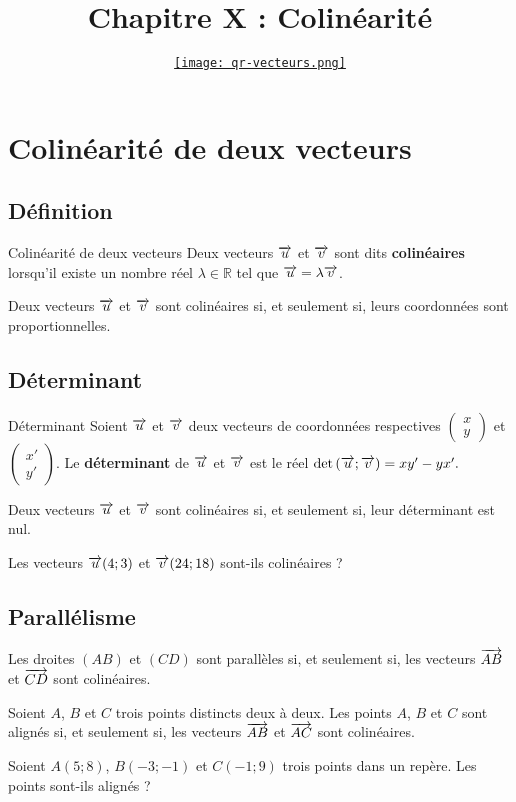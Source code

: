 \documentclass[11pt]{article}
\title{Chapitre X : Colinéarité}
\date{\vspace{-14mm}
\href{https://erou.forge.aeif.fr/s11/vecteurs.html}{
  \texttt{[image: qr-vecteurs.png]}}
\vspace{-12mm}}
\author{}
\begin{document}
\maketitle\thispagestyle{fancy}

\section{Colinéarité de deux vecteurs}
\subsection{Définition}
\begin{defi}{Colinéarité de deux vecteurs}
  Deux vecteurs $\overrightarrow{u}$ et $\overrightarrow{v}$ sont dits \textbf{colinéaires}
  lorsqu'il existe un nombre réel $\lambda\in\mathbb{R}$ tel que $\overrightarrow{u}=\lambda\overrightarrow{v}$.
\end{defi}
\begin{prop}
  Deux vecteurs $\overrightarrow{u}$ et $\overrightarrow{v}$ sont colinéaires si, et seulement si,
  leurs coordonnées sont proportionnelles.
\end{prop}
\subsection{Déterminant}
\begin{defi}{Déterminant}
  Soient $\overrightarrow{u}$ et $\overrightarrow{v}$ deux vecteurs de coordonnées respectives
  $\begin{pmatrix} x\\y\end{pmatrix}$ et $\begin{pmatrix}x'\\y'\end{pmatrix}$.
  Le \textbf{déterminant} de $\overrightarrow{u}$ et $\overrightarrow{v}$ est le réel $\det\left(\overrightarrow{u};
  \overrightarrow{v}\right)=xy'-yx'.$
\end{defi}
\begin{prop}
  Deux vecteurs $\overrightarrow{u}$ et $\overrightarrow{v}$ sont colinéaires si, et seulement si,
  leur déterminant est nul.
\end{prop}
\begin{app}
  Les vecteurs $\overrightarrow{u}(4; 3)$ et $\overrightarrow{v}(24; 18)$ sont-ils colinéaires ?
\end{app}
\subsection{Parallélisme}
\begin{prop}
  Les droites $(AB)$ et $(CD)$ sont parallèles si, et seulement si, les vecteurs
  $\overrightarrow{AB}$ et $\overrightarrow{CD}$ sont colinéaires.
\end{prop}
\begin{prop}
  Soient $A$, $B$ et $C$ trois points distincts deux à deux. Les points $A$, $B$
  et $C$ sont alignés si, et seulement si, les vecteurs
  $\overrightarrow{AB}$ et $\overrightarrow{AC}$ sont colinéaires.
\end{prop}
\begin{app}
  Soient $A(5; 8)$, $B(-3; -1)$ et $C(-1; 9)$ trois points dans un repère.
  Les points sont-ils alignés ?
\end{app}
\end{document}
